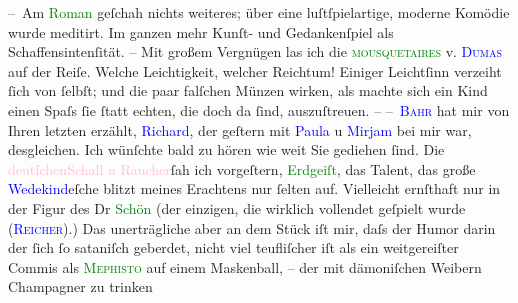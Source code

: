            \pstart
           – Am \textcolor{green}{Roman}{} geſchah nichts
                    weiteres; über eine luſtſpielartige, moderne Komödie wurde meditirt. Im ganzen
                    mehr Kunſt- und Gedankenſpiel als Schaffensintenſität. –\pend
           \pstart
           Mit großem Vergnügen las ich die \textcolor{green}{\textsc{mousquetaires}}{}\ledrightnote{\textcolor{green}{Die drei Musketiere}} v. \textcolor{blue}{\textsc{Dumas}}{}\ledrightnote{\textcolor{blue}{Alexandre père Dumas}} auf der Reiſe. Welche Leichtigkeit,
                    welcher Reichtum! Einiger Leichtſinn verzeiht ſich von ſelbſt; {\pb}und die paar falſchen Münzen wirken, als machte
                    sich ein Kind  einen Spaſs ſie ſtatt
                    echten, die doch da ſind, auszuſtreuen. –\pend
           \pstart
           – \textsc{\textcolor{blue}{Bahr}{}\ledrightnote{\textcolor{blue}{Hermann Bahr}}} hat mir von Ihren letzten \label{K_L01300_1v}\label{K_L01300_1h} erzählt, \textcolor{blue}{Richard}{}\ledrightnote{\textcolor{blue}{Richard Beer-Hofmann}}, der geſtern mit \textcolor{blue}{Paula}{}\ledrightnote{\textcolor{blue}{Paula Beer-Hofmann}} u \textcolor{blue}{Mirjam}{}\ledrightnote{\textcolor{blue}{Mirjam Beer-Hofmann}} bei mir war,
                    desgleichen. Ich wünſchte bald zu hören wie weit Sie gediehen ſind.\pend
           \pstart
           Die \textcolor{pink}{deutſchen}{}\ledrightnote{\textcolor{pink}{Deutschland}}{ }\textcolor{pink}{Schall u Raucher}{}\ledrightnote{\textcolor{pink}{Schall und Rauch}}{ }ſah ich \introOben{}vor\introOben{}geſtern, \textcolor{green}{Erdgeiſt}{}\ledrightnote{\textcolor{green}{Erdgeist. Tragödie in vier Aufzügen}}, das Talent, das große \textcolor{blue}{Wedekind}{}\ledrightnote{\textcolor{blue}{Frank Wedekind}}eſche {\pb}blitzt meines
                    Erachtens nur ſelten auf. Vielleicht ernſthaft nur in der Figur des Dr \textcolor{green}{Schön}{} (der einzigen, die
                    wirklich vollendet geſpielt wurde \introOben{}(\textsc{\textcolor{blue}{Reicher}{}\ledrightnote{\textcolor{blue}{Emanuel Reicher}}})\introOben{}.) Das unerträgliche aber an dem Stück iſt mir, daſs der Humor
                    darin der ſich ſo sataniſch geberdet, nicht viel teufliſcher iſt als ein
                    weitgereiſter Commis \introOben{}als \textsc{\textcolor{green}{Mephisto}{}}\introOben{} auf einem Maskenball, – der mit dämoniſchen Weibern Champagner zu trinken
